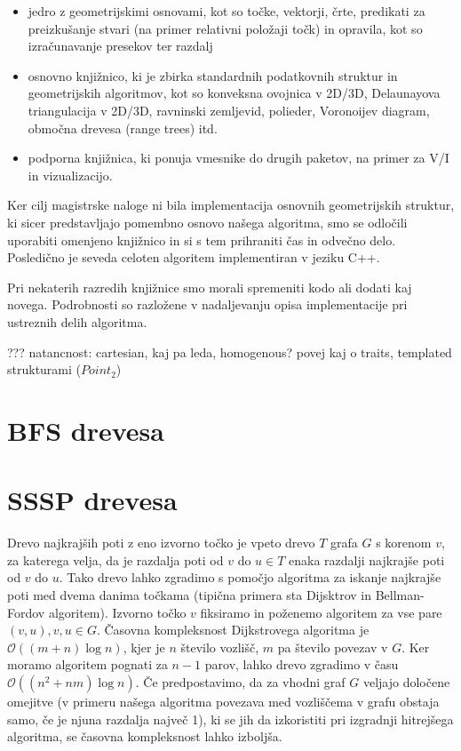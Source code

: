\documentclass[a4paper, 12pt]{book}
\newcommand{\OO}{\ensuremath{\mathcal{O}}} %
\begin{document}
\begin{itemize}
\item jedro z geometrijskimi osnovami, kot so točke, vektorji, črte, predikati za preizkušanje stvari (na primer relativni položaji točk) in opravila, kot so izračunavanje presekov ter razdalj
\item osnovno knjižnico, ki je zbirka standardnih podatkovnih struktur in geometrijskih algoritmov, kot so konveksna ovojnica v 2D/3D, Delaunayova triangulacija v 2D/3D, ravninski zemljevid, polieder, Voronoijev diagram, območna drevesa (range trees) itd.
\item podporna knjižnica, ki ponuja vmesnike do drugih paketov, na primer za V/I in vizualizacijo. 
\end{itemize}

Ker cilj magistrske naloge ni bila implementacija osnovnih geometrijskih struktur, ki sicer predstavljajo pomembno osnovo našega algoritma, smo se odločili uporabiti omenjeno knjižnico in si s tem prihraniti čas in odvečno delo. Posledično je seveda celoten algoritem implementiran v jeziku C++.

Pri nekaterih razredih knjižnice smo morali spremeniti kodo ali dodati kaj novega. Podrobnosti so razložene v nadaljevanju opisa implementacije pri ustreznih delih algoritma.

??? 
natancnost: cartesian, kaj pa leda, homogenous?
povej kaj o traits, templated strukturami ($Point_2$) 

\section{BFS drevesa}
\section{SSSP drevesa}
Drevo najkrajših poti z eno izvorno točko je vpeto drevo $T$ grafa $G$ s korenom $v$, za katerega velja, da je razdalja poti od $v$ do $u \in T$ enaka razdalji najkrajše poti od $v$ do $u$. Tako drevo lahko zgradimo s pomočjo algoritma za iskanje najkrajše poti med dvema danima točkama (tipična primera sta Dijsktrov in Bellman-Fordov algoritem). Izvorno točko $v$ fiksiramo in poženemo algoritem za vse pare $(v, u), v,u \in G.$ Časovna kompleksnost Dijkstrovega algoritma je $\OO((m+n)\log n)$, kjer je $n$ število vozlišč, $m$ pa število povezav v $G$. Ker moramo algoritem pognati za $n-1$ parov, lahko drevo zgradimo v času $\OO((n^2 + nm)\log n)$. Če predpostavimo, da za vhodni graf $G$ veljajo določene omejitve (v primeru našega algoritma povezava med vozliščema v grafu obstaja samo, če je njuna razdalja največ 1), ki se jih da izkoristiti pri izgradnji hitrejšega algoritma, se časovna kompleksnost lahko izboljša.
\end{document}
